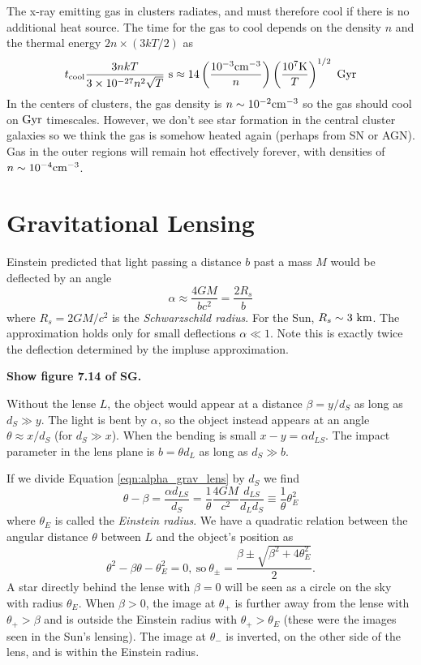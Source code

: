 \documentclass[]{article}
\begin{document}
The x-ray emitting gas in clusters radiates, and must
therefore cool if there is no additional 
heat source.  The time for the gas to cool 
depends on the density $n$ and the thermal
energy $2n \times (3kT/2)$ as
\begin{equation}
t_{\mathrm{cool}} \frac{3nkT}{3\times 10^{-27}n^2\sqrt{T}}~\mathrm{s}\approx 14\left(\frac{10^{-3}\mathrm{cm}^{-3}}{n}\right)\left(\frac{10^{7}\mathrm{K}}{T}\right)^{1/2}~\mathrm{Gyr}
\end{equation}
\noindent
In the centers of clusters, the gas density is $n\sim10^{-2}\mathrm{cm}^{-3}$ so
the gas should cool on $\mathrm{Gyr}$ timescales.  However, we don't see star
formation in the central cluster galaxies so we think the gas is somehow
heated again (perhaps from SN or AGN).  Gas in the outer regions
will remain hot effectively forever, with densities of $n\sim10^{-4}\mathrm{cm}^{-3}$.

\section{Gravitational Lensing}

Einstein predicted that light passing a distance $b$
past a mass $M$ would be deflected by an angle
\begin{equation}
\label{eqn:alpha_grav_lens}
\alpha \approx \frac{4GM}{bc^2} = \frac{2R_s}{b}
\end{equation}
\noindent
where $R_s = 2 GM/c^2$ is the {\it Schwarzschild radius}.
For the Sun, $R_s\sim3~\mathrm{km}$. The approximation
holds only for small deflections $\alpha\ll1$.
Note this is exactly twice the deflection determined by 
the impluse approximation.

{\bf Show figure 7.14 of SG.}

Without the lense $L$, the object would appear at a distance
$\beta = y/d_{S}$ as long as $d_{S} \gg y$.
The light is bent by $\alpha$, so the object instead appears
at an angle $\theta \approx x/d_S$ (for $d_S \gg x$).
When the bending is small $x-y = \alpha d_{LS}$.
The impact parameter in the lens plane is $b = \theta d_{L}$
as long as $d_S \gg b$.

If we divide Equation \ref{eqn:alpha_grav_lens} by $d_S$
we find
\begin{equation}
\theta - \beta = \frac{\alpha d_{LS}}{d_S} = \frac{1}{\theta} \frac{4 GM}{c^2} \frac{d_{LS}}{d_L d_S} \equiv \frac{1}{\theta} \theta_E^2
\end{equation}
\noindent
where $\theta_E$ is called the {\it Einstein radius}.
We have a quadratic relation between the angular distance $\theta$ between
$L$ and the object's position as
\begin{equation}
\theta^2 - \beta \theta - \theta_E^2 = 0,~\mathrm{so}~\theta_{\pm} = \frac{\beta \pm \sqrt{\beta^2 + 4 \theta_E^2}}{2}.
\end{equation}
\noindent
A star directly behind the lense with $\beta=0$ will be seen as a circle
on the sky with radius $\theta_E$.  When $\beta>0$, the image at $\theta_{+}$
is further away from the lense with $\theta_{+}>\beta$ and is outside
the Einstein radius with $\theta_{+}>\theta_E$ (these were the images
seen in the Sun's lensing).  The image at $\theta_{-}$ is inverted, on
the other side of the lens, and is within the Einstein radius.
\end{document}
